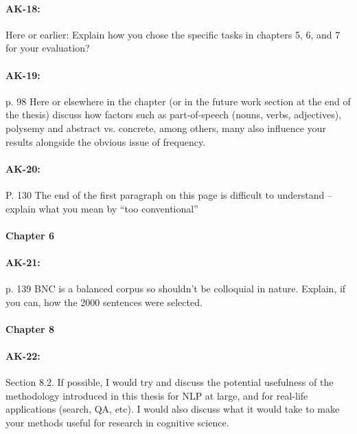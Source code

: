 \documentclass[11pt,a4paper]{article}
\begin{document}
\paragraph{AK-18:} Here or earlier: Explain how you chose the specific tasks in chapters 5, 6, and 7 for your evaluation?

\paragraph{AK-19:} p. 98 Here or elsewhere in the chapter (or in the future work section at the end of the thesis) discuss how factors such as part-of-speech (nouns, verbs, adjectives), polysemy and abstract vs. concrete, among others, many also influence your results alongside the obvious issue of frequency.

\paragraph{AK-20:} P. 130 The end of the first paragraph on this page is difficult to understand – explain what you mean by “too conventional”

\paragraph{Chapter 6}

\paragraph{AK-21:} p. 139 BNC is a balanced corpus so shouldn’t be colloquial in nature. Explain, if you can, how the 2000 sentences were selected.

\paragraph{Chapter 8}

\paragraph{AK-22:} Section 8.2. If possible, I would try and discuss the potential usefulness of the methodology introduced in this thesis for NLP at large, and for real-life applications (search, QA, etc). I would also discuss what it would take to make your methods useful for research in cognitive science.
\end{document}
